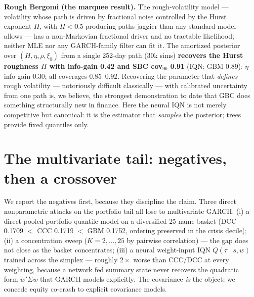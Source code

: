 \documentclass[11pt]{article}
\theoremstyle{remark}
\begin{document}
\textbf{Rough Bergomi (the marquee result).} The rough-volatility model
\citep{bayer2016rbergomi, gatheral2018roughvol} --- volatility whose path
is driven by fractional noise controlled by the Hurst exponent $H$, with
$H<0.5$ producing paths jaggier than any standard model allows ---
has a non-Markovian fractional driver and no tractable likelihood;
neither MLE nor any GARCH-family filter can fit it. The amortized
posterior over $(H, \eta, \rho, \xi_0)$ from a single 252-day path (30k
sims) \textbf{recovers the Hurst roughness $H$ with info-gain 0.42 and
SBC cov$_{90}$ 0.91} (IQN; GBM 0.89); $\eta$ info-gain 0.30; all
coverages 0.85--0.92. Recovering the parameter that \emph{defines} rough
volatility --- notoriously difficult classically --- with calibrated
uncertainty from one path is, we believe, the strongest demonstration to
date that GBC does something structurally new in finance. Here the
neural IQN is not merely competitive but canonical: it is the estimator
that \emph{samples} the posterior; trees provide fixed quantiles only.

\section{The multivariate tail: negatives, then a crossover}
\label{sec:multivariate}

We report the negatives first, because they discipline the claim. Three
direct nonparametric attacks on the portfolio tail all lose to
multivariate GARCH: (i) a direct pooled portfolio-quantile model on a
diversified 25-name basket \citep[DCC/CCC --- multivariate GARCH with
dynamic (DCC) or constant (CCC) correlations across assets ---
benchmarks
after][]{engle2002dcc} (DCC 0.1709 $<$ CCC 0.1719 $<$ GBM 0.1752,
ordering preserved in the crisis decile); (ii) a concentration sweep
($K = 2,\dots,25$ by pairwise correlation) --- the gap does not close as
the basket concentrates; (iii) a neural weight-input IQN
$Q(\tau \mid s, w)$ trained across the simplex --- roughly $2\times$
worse than CCC/DCC at every weighting, because a network fed summary
state never recovers the quadratic form $w'\Sigma w$ that GARCH models
explicitly. The covariance \emph{is} the object; we concede equity
co-crash to explicit covariance models.
\end{document}
